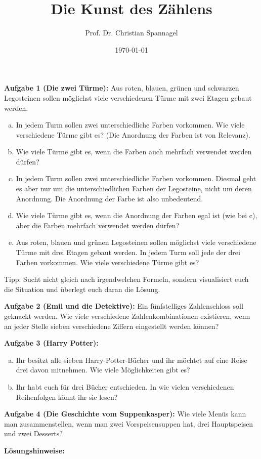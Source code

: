 \documentclass{cssheet}
\title{Die Kunst des Zählens}
\author{Prof. Dr. Christian Spannagel}
\date{\today}
\begin{document}
\printtitle

\vspace*{10mm}

\textbf{Aufgabe 1 (Die zwei Türme):}  Aus roten, blauen, grünen und schwarzen Legosteinen sollen möglichst viele verschiedenen Türme mit zwei Etagen gebaut werden.
\begin{enumerate}[a)]
\item In jedem Turm sollen zwei unterschiedliche Farben vorkommen. Wie viele verschiedene Türme gibt es? (Die Anordnung der Farben ist von Relevanz).
\item Wie viele Türme gibt es, wenn die Farben auch mehrfach verwendet werden dürfen?
\item In jedem Turm sollen zwei unterschiedliche Farben vorkommen. Diesmal geht es aber nur um die unterschiedlichen Farben der Legosteine, nicht um deren Anordnung. Die Anordnung der Farbe ist also unbedeutend.
\item Wie viele Türme gibt es, wenn die Anordnung der Farben egal ist (wie bei c), aber die Farben mehrfach verwendet werden dürfen? 
\item Aus roten, blauen und grünen Legosteinen sollen möglichst viele verschiedene Türme mit drei Etagen gebaut werden. In jedem Turm soll jede der drei Farben vorkommen. Wie viele verschiedene Türme gibt es?
\end{enumerate}
Tipp: Sucht nicht gleich nach irgendwelchen Formeln, sondern visualisiert euch die Situation und überlegt euch daran die Lösung.


\textbf{Aufgabe 2 (Emil und die Detektive):} Ein fünfstelliges Zahlenschloss soll geknackt werden. Wie viele verschiedene Zahlenkombinationen existieren, wenn an jeder Stelle sieben verschiedene Ziffern eingestellt werden können? 


\textbf{Aufgabe 3 (Harry Potter):} 
\begin{enumerate}[a)]
\item Ihr besitzt alle sieben Harry-Potter-Bücher und ihr möchtet auf eine Reise drei davon mitnehmen. Wie viele Möglichkeiten gibt es?
\item Ihr habt euch für drei Bücher entschieden. In wie vielen verschiedenen Reihenfolgen könnt ihr sie lesen?
\end{enumerate}


\textbf{Aufgabe 4 (Die Geschichte vom Suppenkasper):} Wie viele Menüs kann man zusammenstellen, wenn man zwei Vorspeisensuppen hat, drei Hauptspeisen und zwei Desserts?

\newpage
\textbf{Lösungshinweise:} 
\end{document}
